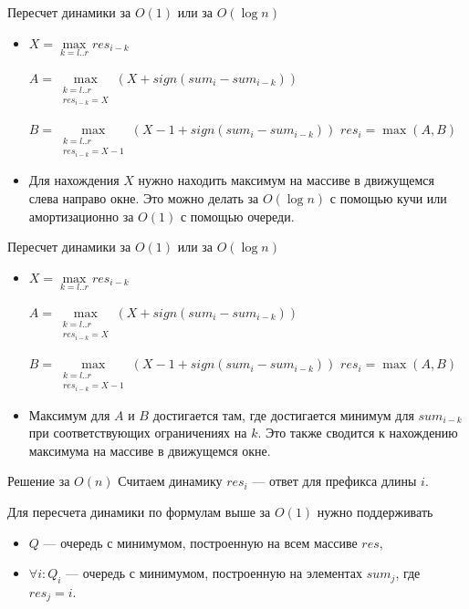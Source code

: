 \begin{frame}[t]{Пересчет динамики за $O(1)$ или за $O(\log n)$}
\begin{itemize}
  \item $X = \max\limits_{k=l..r} res_{i-k}$
      
        $A = \max\limits_{\substack{k=l..r\\
                                    res_{i-k}=X}} \left(X + sign(sum_i - sum_{i-k})\right)$
        
        $B = \max\limits_{\substack{k=l..r\\
                                    res_{i-k}=X-1}} \left(X-1 + sign(sum_i - sum_{i-k})\right)$
        $res_i = \max(A, B)$


  \item Для нахождения $X$ нужно находить максимум на массиве в движущемся слева направо окне.
        Это можно делать за $O(\log n)$ с помощью кучи или амортизационно за $O(1)$ с помощью очереди.

\end{itemize}
\end{frame}

\begin{frame}[t]{Пересчет динамики за $O(1)$ или за $O(\log n)$}
\begin{itemize}
  \item $X = \max\limits_{k=l..r} res_{i-k}$
      
        $A = \max\limits_{\substack{k=l..r\\
                                    res_{i-k}=X}} \left(X + sign(sum_i - sum_{i-k})\right)$
        
        $B = \max\limits_{\substack{k=l..r\\
                                    res_{i-k}=X-1}} \left(X-1 + sign(sum_i - sum_{i-k})\right)$
        $res_i = \max(A, B)$

  \item Максимум для $A$ и $B$ достигается там, где достигается минимум для $sum_{i-k}$ при соответствующих ограничениях на $k$.
        Это также сводится к нахождению максимума на массиве в движущемся окне.
\end{itemize}
\end{frame}

\begin{frame}[t]{Решение за $O(n)$}
  Считаем динамику $res_i$ --- ответ для префикса длины $i$.

  Для пересчета динамики по формулам выше за $O(1)$ нужно поддерживать
\begin{itemize}
  \item $Q$ --- очередь с минимумом, построенную на всем массиве $res$,
  \item $\forall i : Q_i$ --- очередь с минимумом, построенную на элементах $sum_j$, где $res_j = i$.
\end{itemize}
\end{frame}

